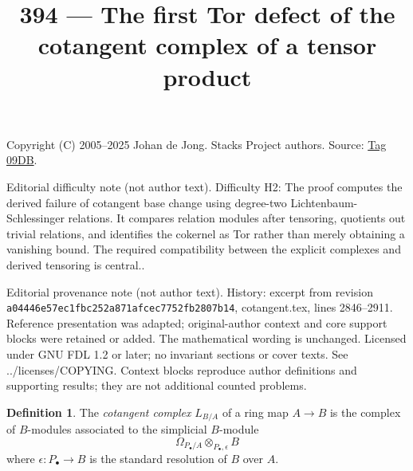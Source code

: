 \documentclass{amsart}
\theoremstyle{plain}
\theoremstyle{definition}
\newtheorem{definition}[subsection]{Definition}
\theoremstyle{remark}
\numberwithin{equation}{subsection}
\begin{document}
\title[Stacks Project, Tag 09DB]{394 --- The first Tor defect of the cotangent complex of a tensor product}
\maketitle
\noindent Copyright (C) 2005--2025 Johan de Jong. Stacks Project authors. Source: \href{https://stacks.math.columbia.edu/tag/09DB}{Tag 09DB}.

\noindent Editorial difficulty note (not author text). Difficulty H2: The proof computes the derived failure of cotangent base change using degree-two Lichtenbaum-Schlessinger relations. It compares relation modules after tensoring, quotients out trivial relations, and identifies the cokernel as Tor rather than merely obtaining a vanishing bound. The required compatibility between the explicit complexes and derived tensoring is central..

\noindent Editorial provenance note (not author text). History: excerpt from revision \texttt{a0444\allowbreak 6e57e\allowbreak c1fbc\allowbreak 252a8\allowbreak 71afc\allowbreak ec775\allowbreak 2fb28\allowbreak 07b14}, cotangent.tex, lines 2846--2911. Reference presentation was adapted; original-author context and core support blocks were retained or added. The mathematical wording is unchanged. Licensed under GNU FDL 1.2 or later; no invariant sections or cover texts. See ../licenses/COPYING. Context blocks reproduce author definitions and supporting results; they are not additional counted problems.

\begin{definition}
\label{definition-cotangent-complex-ring-map}
The {\it cotangent complex} $L_{B/A}$ of a ring map $A \to B$
is the complex of $B$-modules associated to the simplicial $B$-module
$$
\Omega_{P_\bullet/A} \otimes_{P_\bullet, \epsilon} B
$$
where $\epsilon : P_\bullet \to B$ is the standard resolution
of $B$ over $A$.
\end{definition}
\end{document}
